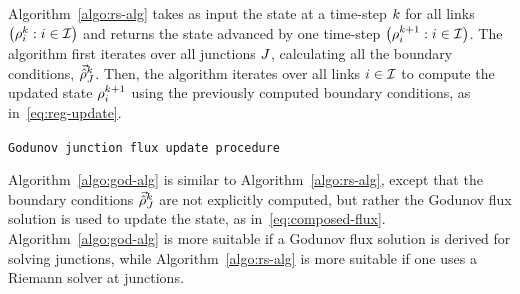 						
						Algorithm~\ref{algo:rs-alg} takes as input the state at a time-step
						$k$ for all links $\left(\discrete{\link}{\tind}:\link\in\links\right)$
						and returns the state advanced by one time-step $\left(\discrete{\link}{\tind+1}:\link\in\links\right)$.
						The algorithm first iterates over all junctions $J$, calculating
						all the boundary conditions, $\vec{\hat{\rho}}_{J}^{k}$. Then, the
						algorithm iterates over all links $i\in\mathcal{I}$ to compute the
						updated state $\rho_{i}^{k+1}$ using the previously computed
						boundary conditions, as in~\eqref{eq:reg-update}.
						
						\begin{algorithm}[h]
							\caption{\texttt{Godunov junction flux update procedure}}
							
							
							
						\end{algorithm}
						
						
						Algorithm~\ref{algo:god-alg} is similar to Algorithm~\ref{algo:rs-alg},
						except that the boundary conditions $\vec{\hat{\rho}}_{J}^{k}$ are
						not explicitly computed, but rather the Godunov flux solution is used
						to update the state, as in~\eqref{eq:composed-flux}. Algorithm~\ref{algo:god-alg}
						is more suitable if a Godunov flux solution is derived for solving
						junctions, while Algorithm~\ref{algo:rs-alg} is more suitable if
						one uses a Riemann solver at junctions.
